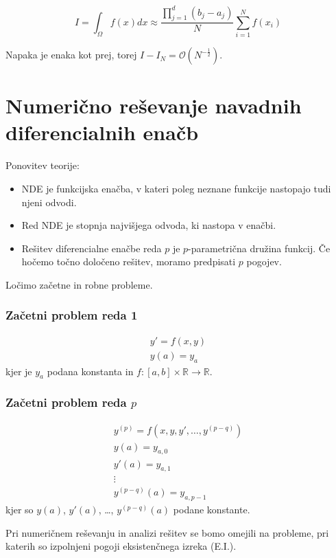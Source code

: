 \documentclass[a4paper,12pt]{article}
\theoremstyle{definition}
\theoremstyle{remark}
\newcommand{\R}{\mathbb{R}}
\begin{document}
\begin{equation*}
    I = \int_{\Omega} f(x) dx \approx \frac{\prod_{j=1}^{d} (b_j - a_j)}{N} \sum_{i=1}^{N} f(x_i)
\end{equation*}

Napaka je enaka kot prej, torej $I - I_N = \mathcal{O}(N^{-\frac{1}{2}})$.

\section{Numerično reševanje navadnih diferencialnih enačb}

Ponovitev teorije:
\begin{itemize}
    \item NDE je funkcijska enačba, v kateri poleg neznane funkcije nastopajo tudi njeni odvodi.
    \item Red NDE je stopnja najvišjega odvoda, ki nastopa v enačbi.
    \item Rešitev diferencialne enačbe reda $p$ je $p$-parametrična družina funkcij. Če hočemo točno določeno rešitev, moramo predpisati $p$ pogojev.
\end{itemize}

Ločimo začetne in robne probleme.

\subsubsection*{Začetni problem reda 1}

\begin{gather*}
    y' = f(x, y) \\
    y(a) = y_a
\end{gather*}
kjer je $y_a$ podana konstanta in $f: [a, b] \times \R \to \R$.

\subsubsection*{Začetni problem reda $p$}
\begin{gather*}
    y^{(p)} = f(x, y, y', \dots, y^{(p-q)}) \\
    y(a) = y_{a, 0} \\
    y'(a) = y_{a, 1} \\
    \vdots \\
    y^{(p-q)}(a) = y_{a, p-1}
\end{gather*}
kjer so $y(a)$, $y'(a)$, \dots, $y^{(p-q)}(a)$ podane konstante.

Pri numeričnem reševanju in analizi rešitev se bomo omejili na probleme, pri katerih so izpolnjeni pogoji eksistenčnega izreka (E.I.).
\end{document}
